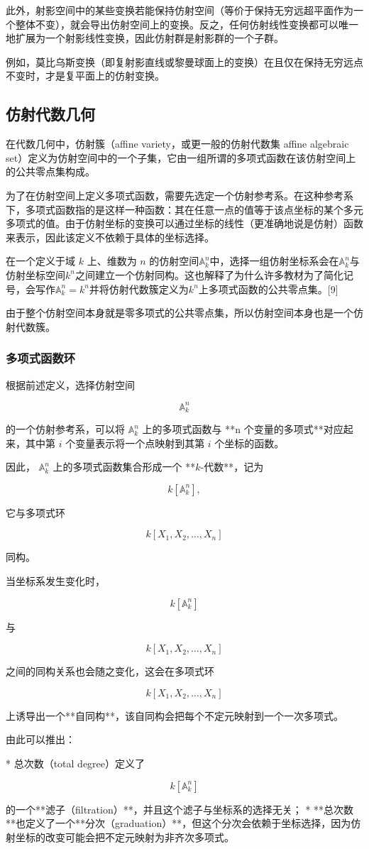 此外，射影空间中的某些变换若能保持仿射空间（等价于保持无穷远超平面作为一个整体不变），就会导出仿射空间上的变换。反之，任何仿射线性变换都可以唯一地扩展为一个射影线性变换，因此仿射群是射影群的一个子群。

例如，莫比乌斯变换（即复射影直线或黎曼球面上的变换）在且仅在保持无穷远点不变时，才是复平面上的仿射变换。
\subsection{仿射代数几何}
在代数几何中，仿射簇（affine variety，或更一般的仿射代数集 affine algebraic set）定义为仿射空间中的一个子集，它由一组所谓的多项式函数在该仿射空间上的公共零点集构成。

为了在仿射空间上定义多项式函数，需要先选定一个仿射参考系。在这种参考系下，多项式函数指的是这样一种函数：其在任意一点的值等于该点坐标的某个多元多项式的值。由于仿射坐标的变换可以通过坐标的线性（更准确地说是仿射）函数来表示，因此该定义不依赖于具体的坐标选择。

在一个定义于域 $k$ 上、维数为 $n$ 的仿射空间$\mathbb{A}_k^n$中，选择一组仿射坐标系会在$\mathbb{A}_k^n$与仿射坐标空间$k^n$之间建立一个仿射同构。这也解释了为什么许多教材为了简化记号，会写作$\mathbb{A}_k^n = k^n$并将仿射代数簇定义为$k^n$上多项式函数的公共零点集。[9]

由于整个仿射空间本身就是零多项式的公共零点集，所以仿射空间本身也是一个仿射代数簇。
\subsubsection{多项式函数环}

根据前述定义，选择仿射空间

$$
\mathbb{A}_k^n
$$

的一个仿射参考系，可以将
$\mathbb{A}_k^n$
上的多项式函数与 **n 个变量的多项式**对应起来，其中第 $i$ 个变量表示将一个点映射到其第 $i$ 个坐标的函数。

因此，
$\mathbb{A}_k^n$
上的多项式函数集合形成一个 **$k$-代数**，记为

$$
k[\mathbb{A}_k^n],
$$

它与多项式环

$$
k[X_1, X_2, \dots, X_n]
$$

同构。

当坐标系发生变化时，

$$
k[\mathbb{A}_k^n]
$$

与

$$
k[X_1, X_2, \dots, X_n]
$$

之间的同构关系也会随之变化，这会在多项式环

$$
k[X_1, X_2, \dots, X_n]
$$

上诱导出一个**自同构**，该自同构会把每个不定元映射到一个一次多项式。

由此可以推出：

* \*\*总次数（total degree）\*\*定义了

  $$
  k[\mathbb{A}_k^n]
  $$

  的一个**滤子（filtration）**，并且这个滤子与坐标系的选择无关；
* **总次数**也定义了一个**分次（graduation）**，但这个分次会依赖于坐标选择，因为仿射坐标的改变可能会把不定元映射为非齐次多项式。
